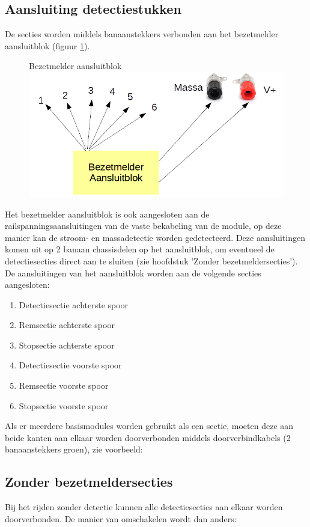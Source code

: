 \documentclass[12pt,a4paper]{report}
\begin{document}
\subsection{Aansluiting detectiestukken}
De secties worden middels banaanstekkers verbonden aan het bezetmelder aansluitblok (figuur \ref{im:rcu_bezetmelderblok}). 

\begin{figure}[h]
  \captionbox
  {Bezetmelder aansluitblok\label{im:rcu_bezetmelderblok}}
  {\includegraphics[scale=1.0]{images/rcu_bezetmelderblok}}
\end{figure}


Het bezetmelder aansluitblok is ook aangesloten aan de railspanningsaansluitingen van de vaste bekabeling van de module, op deze manier kan de stroom- en massadetectie worden gedetecteerd. Deze aansluitingen komen uit op 2 banaan chassisdelen op het aansluitblok, om eventueel de detectiesecties direct aan te sluiten (zie hoofdstuk 'Zonder bezetmeldersecties').
De aansluitingen van het aansluitblok worden aan de volgende secties aangesloten:

\begin{enumerate}
\item Detectiesectie achterste spoor
\item Remsectie achterste spoor
\item Stopsectie achterste spoor
\item Detectiesectie voorste spoor
\item Remsectie voorste spoor
\item Stopsectie voorste spoor
\end{enumerate}

Als er meerdere basismodules worden gebruikt als een sectie, moeten deze aan beide kanten aan elkaar worden doorverbonden middels doorverbindkabels (2 banaanstekkers groen), zie voorbeeld:

\subsection{Zonder bezetmeldersecties}
Bij het rijden zonder detectie kunnen alle detectiesecties aan elkaar worden doorverbonden. De manier van omschakelen wordt dan anders:
\end{document}
